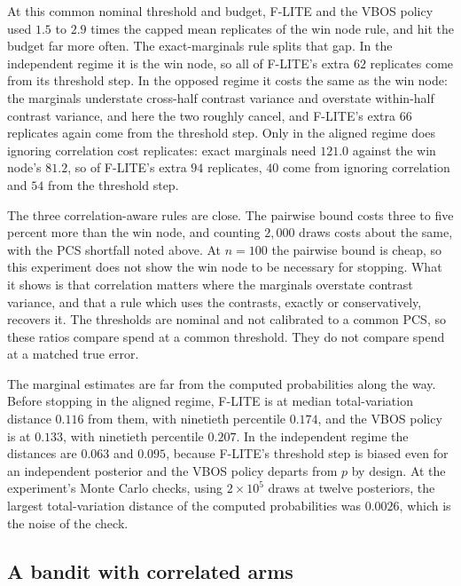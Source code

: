 \documentclass[11pt]{article}
\begin{document}
At this common nominal threshold and budget, F-LITE and the VBOS
policy used $1.5$ to $2.9$ times the capped mean replicates of the
win node rule, and hit the budget far more often. The exact-marginals
rule splits that gap. In the independent regime it is the win node,
so all of F-LITE's extra $62$ replicates come from its threshold
step. In the opposed regime it costs the same as the win node: the
marginals understate cross-half contrast variance and overstate
within-half contrast variance, and here the two roughly cancel, and F-LITE's extra $66$ replicates again come from the
threshold step. Only in the aligned regime does ignoring correlation
cost replicates: exact marginals need $121.0$ against the win node's
$81.2$, so of F-LITE's extra $94$ replicates, $40$ come from ignoring
correlation and $54$ from the threshold step.

The three correlation-aware rules are close. The pairwise bound costs
three to five percent more than the win node, and counting
$2{,}000$ draws costs about the same, with the PCS shortfall noted
above. At $n=100$ the pairwise bound is cheap, so this experiment
does not show the win node to be necessary for stopping. What it
shows is that correlation matters where the marginals overstate
contrast variance, and that a rule which uses the contrasts, exactly
or conservatively, recovers it. The thresholds are nominal and not
calibrated to a common PCS, so these ratios compare spend at a common
threshold. They do not compare spend at a matched true error.

The marginal estimates are far from the computed probabilities along
the way. Before stopping in the aligned regime, F-LITE is at median
total-variation distance $0.116$ from them, with ninetieth percentile
$0.174$, and the VBOS policy is at $0.133$, with ninetieth percentile
$0.207$. In the independent regime the distances are $0.063$ and
$0.095$, because F-LITE's threshold step is biased even for an
independent posterior and the VBOS policy departs from $p$ by design.
At the experiment's Monte Carlo checks, using $2\times10^5$ draws at
twelve posteriors, the largest total-variation distance of the
computed probabilities was $0.0026$, which is the noise of the check.

\subsection{A bandit with correlated arms}
\label{sec:bandit}
\end{document}
